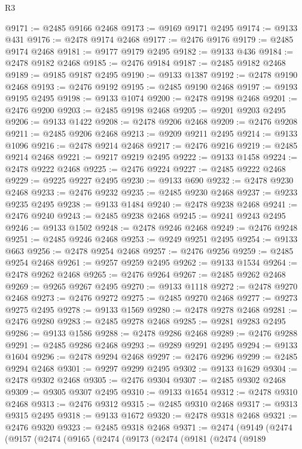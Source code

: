 \begin{lexlean}{R3}
\begin{coremodule}
@9171 := @2485 @9166 @2468
@9173 := @9169 @9171 @2495
@9174 := @9133 @431
@9176 := @2478 @9174 @2468
@9177 := @2476 @9176
@9179 := @2485 @9174 @2468
@9181 := @9177 @9179 @2495
@9182 := @9133 @436
@9184 := @2478 @9182 @2468
@9185 := @2476 @9184
@9187 := @2485 @9182 @2468
@9189 := @9185 @9187 @2495
@9190 := @9133 @1387
@9192 := @2478 @9190 @2468
@9193 := @2476 @9192
@9195 := @2485 @9190 @2468
@9197 := @9193 @9195 @2495
@9198 := @9133 @1074
@9200 := @2478 @9198 @2468
@9201 := @2476 @9200
@9203 := @2485 @9198 @2468
@9205 := @9201 @9203 @2495
@9206 := @9133 @1422
@9208 := @2478 @9206 @2468
@9209 := @2476 @9208
@9211 := @2485 @9206 @2468
@9213 := @9209 @9211 @2495
@9214 := @9133 @1096
@9216 := @2478 @9214 @2468
@9217 := @2476 @9216
@9219 := @2485 @9214 @2468
@9221 := @9217 @9219 @2495
@9222 := @9133 @1458
@9224 := @2478 @9222 @2468
@9225 := @2476 @9224
@9227 := @2485 @9222 @2468
@9229 := @9225 @9227 @2495
@9230 := @9133 @690
@9232 := @2478 @9230 @2468
@9233 := @2476 @9232
@9235 := @2485 @9230 @2468
@9237 := @9233 @9235 @2495
@9238 := @9133 @1484
@9240 := @2478 @9238 @2468
@9241 := @2476 @9240
@9243 := @2485 @9238 @2468
@9245 := @9241 @9243 @2495
@9246 := @9133 @1502
@9248 := @2478 @9246 @2468
@9249 := @2476 @9248
@9251 := @2485 @9246 @2468
@9253 := @9249 @9251 @2495
@9254 := @9133 @663
@9256 := @2478 @9254 @2468
@9257 := @2476 @9256
@9259 := @2485 @9254 @2468
@9261 := @9257 @9259 @2495
@9262 := @9133 @1534
@9264 := @2478 @9262 @2468
@9265 := @2476 @9264
@9267 := @2485 @9262 @2468
@9269 := @9265 @9267 @2495
@9270 := @9133 @1118
@9272 := @2478 @9270 @2468
@9273 := @2476 @9272
@9275 := @2485 @9270 @2468
@9277 := @9273 @9275 @2495
@9278 := @9133 @1569
@9280 := @2478 @9278 @2468
@9281 := @2476 @9280
@9283 := @2485 @9278 @2468
@9285 := @9281 @9283 @2495
@9286 := @9133 @1586
@9288 := @2478 @9286 @2468
@9289 := @2476 @9288
@9291 := @2485 @9286 @2468
@9293 := @9289 @9291 @2495
@9294 := @9133 @1604
@9296 := @2478 @9294 @2468
@9297 := @2476 @9296
@9299 := @2485 @9294 @2468
@9301 := @9297 @9299 @2495
@9302 := @9133 @1629
@9304 := @2478 @9302 @2468
@9305 := @2476 @9304
@9307 := @2485 @9302 @2468
@9309 := @9305 @9307 @2495
@9310 := @9133 @1654
@9312 := @2478 @9310 @2468
@9313 := @2476 @9312
@9315 := @2485 @9310 @2468
@9317 := @9313 @9315 @2495
@9318 := @9133 @1672
@9320 := @2478 @9318 @2468
@9321 := @2476 @9320
@9323 := @2485 @9318 @2468
@9371 := @2474
    (@9149
      (@2474
        (@9157
          (@2474
            (@9165
              (@2474
                (@9173
                  (@2474
                    (@9181
                      (@2474
                        (@9189

\end{coremodule}
\end{lexlean}
